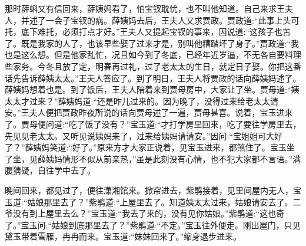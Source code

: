 \begin{parag}
    那时薛蝌又有信回来，薛姨妈看了，怕宝钗耽忧，也不叫他知道。自己来求王夫人，并述了一会子宝钗的病。薛姨妈去后，王夫人又求贾政。贾政道:“此事上头可托，底下难托，必须打点才好。”王夫人又提起宝钗的事来，因说道:“这孩子也苦了。既是我家的人了，也该早些娶了过来才是，别叫他糟踏坏了身子。”贾政道:“我也是这么想。但是他家乱忙，况且如今到了冬底，已经年近岁逼，不无各自要料理些家务。今冬且放了定，明春再过礼，过了老太太的生日，就定日子娶。你把这番话先告诉薛姨太太。”王夫人答应了。到了明日，王夫人将贾政的话向薛姨妈述了。薛姨妈想着也是。到了饭后，王夫人陪着来到贾母房中，大家让了坐。贾母道:“姨太太才过来？”薛姨妈道:“还是昨儿过来的。因为晚了，没得过来给老太太请安。”王夫人便把贾政昨夜所说的话向贾母述了一遍，贾母甚喜。说着，宝玉进来了。贾母便问道:“吃了饭了没有？”宝玉道:“才打学房里回来，吃了要往学房里去，先见见老太太。又听见说姨妈来了，过来给姨妈请请安。”因问:“宝姐姐可大好了？”薛姨妈笑道:“好了。”原来方才大家正说着，见宝玉进来，都煞住了。宝玉坐了坐，见薛姨妈情形不似从前亲热，”虽是此刻没有心情，也不犯大家都不言语。”满腹猜疑，自往学中去了。
\end{parag}


\begin{parag}
    晚间回来，都见过了，便往潇湘馆来。掀帘进去，紫鹃接着，见里间屋内无人，宝玉道:“姑娘那里去了？”紫鹃道:“上屋里去了。知道姨太太过来，姑娘请安去了。二爷没有到上屋里去么？”宝玉道:“我去了来的，没有见你姑娘。”紫鹃道:“这也奇了。”宝玉问:“姑娘到底那里去了？”紫鹃道:“不定。”宝玉往外便走。刚出屋门，只见黛玉带着雪雁，冉冉而来。宝玉道:“妹妹回来了。”缩身退步进来。
\end{parag}


